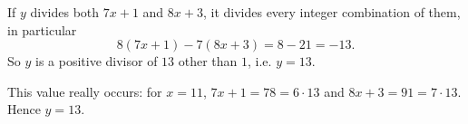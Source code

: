 If $y$ divides both $7x+1$ and $8x+3$, it divides every integer combination of them, in particular
\[8(7x+1)-7(8x+3)=8-21=-13.\]
So $y$ is a positive divisor of $13$ other than $1$, i.e. $y=13$.

This value really occurs: for $x=11$, $7x+1=78=6\cdot13$ and $8x+3=91=7\cdot13$. Hence $\boxed{y=13}$.
